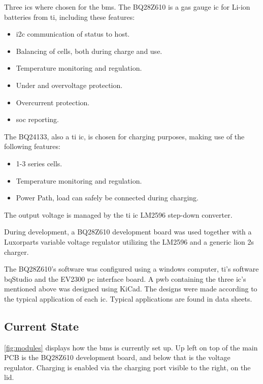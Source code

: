 Three \gls{ic}s where chosen for the \gls{bms}. The BQ28Z610 is a gas gauge \gls{ic} for Li-ion batteries from \gls{ti}, including these features:

\begin{itemize}[noitemsep]
	\item \gls{i2c} communication of status to host.
	\item Balancing of cells, both during charge and use.
	\item Temperature monitoring and regulation.
	\item Under and overvoltage protection.
	\item Overcurrent protection.
	\item \gls{soc} reporting.
\end{itemize}

The BQ24133, also a \gls{ti} \gls{ic}, is chosen for charging purposes, making use of the following features:

\begin{itemize}[noitemsep]
	\item 1-3 series cells.
	\item Temperature monitoring and regulation.
	\item Power Path, load can safely be connected during charging.
\end{itemize}

The output voltage is managed by the \gls{ti} \gls{ic} LM2596 step-down converter.

During development, a BQ28Z610 development board was used together with a Luxorparts variable voltage regulator utilizing the LM2596 and a generic \gls{lion} \gls{2s} charger.

The BQ28Z610’s software was configured using a windows computer, \gls{ti}’s software bqStudio and the EV2300 \gls{pc} interface board.
A \gls{pwb} containing the three \gls{ic}’s mentioned above was designed using KiCad. The designs were made according to the typical application of each \gls{ic}. Typical applications are found in data sheets.  

\subsection{Current State}
\autoref{fig:modules} displays how the \gls{bms} is currently set up. Up left on top of the main PCB is the BQ28Z610 development board, and below that is the voltage regulator. Charging is enabled via the charging port visible to the right, on the lid.

